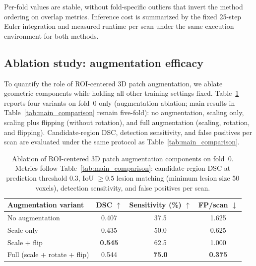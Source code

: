 \documentclass{iopjournal}
\begin{document}
Per-fold values are stable, without fold-specific outliers that invert the method ordering on overlap metrics. Inference cost is summarized by the fixed 25-step Euler integration and measured runtime per scan under the same execution environment for both methods.

\subsection{Ablation study: augmentation efficacy}\label{sec:aug_ablation}
To quantify the role of ROI-centered 3D patch augmentation, we ablate geometric components while holding all other training settings fixed. Table~\ref{tab:aug_ablation} reports four variants on fold~0 only (augmentation ablation; main results in Table~\ref{tab:main_comparison} remain five-fold): no augmentation, scaling only, scaling plus flipping (without rotation), and full augmentation (scaling, rotation, and flipping). Candidate-region DSC, detection sensitivity, and false positives per scan are evaluated under the same protocol as Table~\ref{tab:main_comparison}.

\begin{table}
\caption{\label{tab:aug_ablation}Ablation of ROI-centered 3D patch augmentation components on fold~0. Metrics follow Table~\ref{tab:main_comparison}: candidate-region DSC at prediction threshold 0.3, IoU $\ge 0.5$ lesion matching (minimum lesion size 50 voxels), detection sensitivity, and false positives per scan.}
\begin{center}
\begin{tabular}{lccc}
\hline
Augmentation variant & DSC $\uparrow$ & Sensitivity (\%) $\uparrow$ & FP/scan $\downarrow$ \\
\hline
No augmentation & 0.407 & 37.5 & 1.625 \\
Scale only & 0.435 & 50.0 & 0.625 \\
Scale + flip & \textbf{0.545} & 62.5 & 1.000 \\
Full (scale + rotate + flip) & 0.544 & \textbf{75.0} & \textbf{0.375} \\
\hline
\end{tabular}
\end{center}
\end{table}
\end{document}

